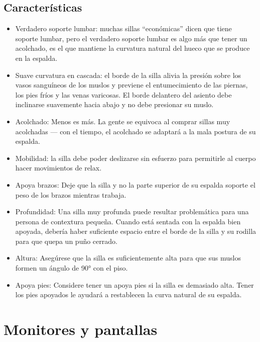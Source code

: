 \subsection{Características}
\begin{itemize}
\item Verdadero soporte lumbar: muchas sillas “económicas” dicen que tiene soporte lumbar, pero el verdadero soporte lumbar es algo más que tener un acolchado, es el que mantiene la curvatura natural del hueco que se produce en la espalda.
\item Suave curvatura en cascada: el borde de la silla alivia la presión sobre los vasos sanguíneos de los muslos y previene el entumecimiento de las piernas, los pies fríos y las venas varicosas. El borde delantero del asiento debe inclinarse suavemente hacia abajo y no debe presionar su muslo.
\item Acolchado: Menos es más. La gente se equivoca al comprar sillas muy acolchadas — con el tiempo, el acolchado se adaptará a la mala postura de su espalda.
\item Mobilidad: la silla debe poder deslizarse sin esfuerzo para permitirle al cuerpo hacer movimientos de relax.
\item Apoya brazos: Deje que la silla y no la parte superior de su espalda soporte el peso de los brazos mientras trabaja.
\item Profundidad: Una silla muy profunda puede resultar problemática para una persona de contextura pequeña. Cuando está sentada con la espalda bien apoyada, debería haber suficiente espacio entre el borde de la silla y su rodilla para que quepa un puño cerrado.
\item Altura: Asegúrese que la silla es suficientemente alta para que sus muslos formen un ángulo de 90° con el piso.
\item Apoya pies: Considere tener un apoya pies si la silla es demasiado alta. Tener los pies apoyados le ayudará a restablecen la curva natural de su espalda.
\end{itemize}

\section{Monitores y pantallas}
